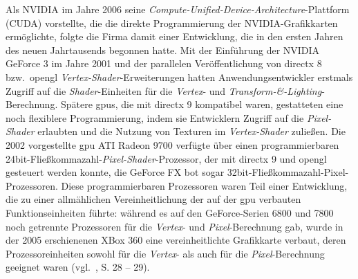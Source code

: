 Als NVIDIA{\textregistered} im Jahre 2006 seine \textit{Compute-Unified-Device-Architecture}-Plattform
(CUDA{\textregistered}) vorstellte, die die direkte Programmierung der NVIDIA{\textregistered}-Grafikkarten ermöglichte,
folgte die Firma damit einer Entwicklung, die in den ersten Jahren des neuen Jahrtausends begonnen hatte. Mit der
Einführung der NVIDIA{\textregistered} GeForce 3 im Jahre 2001 und der parallelen Veröffentlichung von \gls{directx} 8
bzw.\ \gls{opengl} \textit{Vertex-Shader}-Erweiterungen hatten Anwendungsentwickler erstmals Zugriff auf die
\textit{Shader}-Einheiten für die \textit{Vertex}- und \textit{Transform-\&-Lighting}-Berechnung. Spätere \gls{gpu}s,
die mit \gls{directx} 9 kompatibel waren, gestatteten eine noch flexiblere Programmierung, indem sie Entwicklern Zugriff
auf die \textit{Pixel-Shader} erlaubten und die Nutzung von Texturen im \textit{Vertex-Shader} zuließen. Die 2002
vorgestellte \gls{gpu} ATI Radeon 9700 verfügte über einen programmierbaren
24bit-Fließkommazahl-\textit{Pixel-Shader}-Prozessor, der mit \gls{directx} 9 und \gls{opengl} gesteuert werden
konnte, die GeForce{\textregistered} FX bot sogar 32bit-Fließkommazahl-Pixel-Prozessoren. Diese programmierbaren
Prozessoren waren Teil einer Entwicklung, die zu einer allmählichen Vereinheitlichung der auf der \gls{gpu} verbauten
Funktionseinheiten führte: während es auf den GeForce{\textregistered}-Serien 6800 und 7800 noch getrennte Prozessoren
für die \textit{Vertex}- und \textit{Pixel}-Berechnung gab, wurde in der 2005 erschienenen XBox 360 eine 
{\glqq}vereinheitlichte{\grqq} Grafikkarte verbaut, deren Prozessoreinheiten sowohl für die \textit{Vertex}- als auch
für die \textit{Pixel}-Berechnung geeignet waren (vgl.~\cite{kirkhwu}, S. 28 -- 29).

